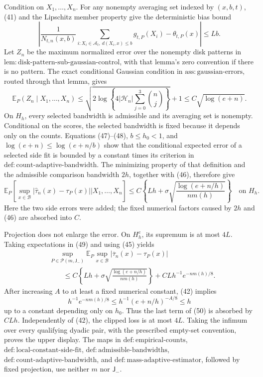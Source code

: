Condition on \(X_1,\ldots,X_n\).  For any nonempty averaging set indexed by \((x,b,t)\), (41) and the Lipschitz member property give the deterministic bias bound
\[
 \left|
 \frac{1}{N_{t,n}(x,b)}
 \sum_{i:X_i\in\mathcal A_t,\ d(X_i,x)\le b}g_{t,P}(X_i)
 -\theta_{t,P}(x)
 \right|\le Lb. \tag{47}
\]
Let \(Z_n\) be the maximum normalized error over the nonempty disk patterns in \(\mathrm{lem:disk\text{-}pattern\text{-}sub\text{-}gaussian\text{-}control}\), with that lemma's zero convention if there is no pattern.  The exact conditional Gaussian condition in \(\mathrm{ass:gaussian\text{-}errors}\), routed through that lemma, gives
\[
 \mathbb E_P(Z_n\mid X_1,\ldots,X_n)
 \le
 \sqrt{2\log\!\left\{4|\mathcal H_n|\sum_{j=0}^{3}\binom nj\right\}}+1
 \le C\sqrt{\log(e+n)}. \tag{48}
\]
On \(H_h\), every selected bandwidth is admissible and its averaging set is nonempty.  Conditional on the scores, the selected bandwidth is fixed because it depends only on the counts.  Equations (47)--(48), \(b\le h_0<1\), and \(\log(e+n)\le\log(e+n/b)\) show that the conditional expected error of a selected side fit is bounded by a constant times its criterion in \(\mathrm{def:count\text{-}adaptive\text{-}bandwidth}\).  The minimizing property of that definition and the admissible comparison bandwidth \(2h\), together with (46), therefore give
\[
 \mathbb E_P\!\left[
 \sup_{x\in\mathcal B}|\widehat\tau_n(x)-\tau_P(x)|
 \mathrel{\Big|}X_1,\ldots,X_n
 \right]
 \le C\left\{Lh+\sigma
 \sqrt{\frac{\log(e+n/h)}{nm(h)}}\right\}
 \quad\text{on }H_h. \tag{49}
\]
Here the two side errors were added; the fixed numerical factors caused by \(2h\) and (46) are absorbed into \(C\).

Projection does not enlarge the error.  On \(H_h^c\), its supremum is at most \(4L\).  Taking expectations in (49) and using (45) yields
\[
 \begin{aligned}
 &\sup_{P\in\mathcal P(m,\mathsf J_{-})}
 \mathbb E_P\sup_{x\in\mathcal B}
 |\overline\tau_n(x)-\tau_P(x)|\\
 &\qquad\le C\left\{Lh+\sigma
 \sqrt{\frac{\log(e+n/h)}{nm(h)}}\right\}
 +CLh^{-1}e^{-nm(h)/8}. 
 \end{aligned} \tag{50}
\]
After increasing \(A\) to at least a fixed numerical constant, (42) implies
\[
 h^{-1}e^{-nm(h)/8}
 \le h^{-1}(e+n/h)^{-A/8}
 \le h
\]
up to a constant depending only on \(h_0\).  Thus the last term of (50) is absorbed by \(CLh\).  Independently of (42), the clipped loss is at most \(4L\).  Taking the infimum over every qualifying dyadic pair, with the prescribed empty-set convention, proves the upper display.  The maps in \(\mathrm{def:empirical\text{-}counts}\), \(\mathrm{def:local\text{-}constant\text{-}side\text{-}fit}\), \(\mathrm{def:admissible\text{-}bandwidths}\), \(\mathrm{def:count\text{-}adaptive\text{-}bandwidth}\), and \(\mathrm{def:mass\text{-}adaptive\text{-}estimator}\), followed by fixed projection, use neither \(m\) nor \(\mathsf J_{-}\).


